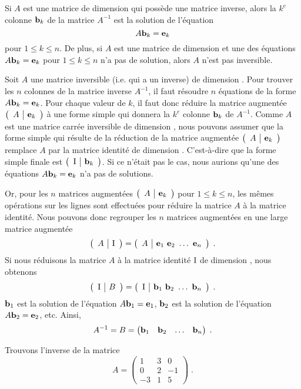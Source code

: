{\begin{prop}
Si $A$ est une matrice de dimension \nn qui possède une matrice
inverse, alors la $k^e$ colonne $\mathbf{b}_k$ de la matrice $A^{-1}$
est la solution de l'équation
\[
A\mathbf{b}_k = \mathbf{e}_k
\]
pour $1\leq k \leq n$.  De plus, si $A$ est une matrice de dimension
\nn et une des équations $A\mathbf{b}_k = \mathbf{e}_k$ pour $1\leq k \leq
n$ n'a pas de solution, alors $A$ n'est pas inversible.
\end{prop}

Soit $A$ une matrice inversible (i.e. qui a un inverse) de dimension
\nn.  Pour trouver les $n$ colonnes de la matrice inverse $A^{-1}$, il
faut résoudre $n$ équations de la forme $A\mathbf{b}_k = \mathbf{e}_k$.
Pour chaque valeur de $k$, il faut donc réduire la matrice augmentée
$\left(\begin{array}{c|c}{A}&{\mathbf{e}_k}\end{array}\right)$ à une forme simple qui donnera la $k^e$ colonne
$\mathbf{b}_k$ de $A^{-1}$.  Comme $A$ est une matrice carrée inversible
de dimension \nn, nous pouvons assumer que la forme simple qui résulte de
la réduction de la matrice augmentée $\left(\begin{array}{c|c}{A}&{\mathbf{e}_k}\end{array}\right)$ remplace
$A$ par la matrice identité de dimension \nn.  C'est-à-dire que la
forme simple finale est $\left(\begin{array}{c|c}{\operatorname{I}}&{\mathbf{b}_k}\end{array}\right)$.  Si ce n'était pas
le cas, nous aurions qu'une des équations $A\mathbf{b}_k = \mathbf{e}_k$ n'a
pas de solutions.

Or, pour les $n$ matrices augmentées $\left(\begin{array}{c|c}{A}&{\mathbf{e}_k}\end{array}\right)$ pour
$1\leq k \leq n$, les mêmes opérations sur les lignes sont effectuées
pour réduire la matrice $A$ à la matrice identité.  Nous pouvons donc
regrouper les $n$ matrices augmentées en une large matrice augmentée
\[
\Maug{A}{\Id} = \Maug{A}{\VEC{e}_1\ \VEC{e}_2\ \ldots\ \VEC{e}_n} \; .
\]
Si nous réduisons la matrice $A$ à la matrice identité $\operatorname{I}$ de dimension
\nn, nous obtenons
\[
\left(\begin{array}{c|c}{\operatorname{I}}&{B}\end{array}\right) = \left(\begin{array}{c|c}{\operatorname{I}}&{\mathbf{b}_1\ \mathbf{b}_2\ \ldots\ \mathbf{b}_n}\end{array}\right) \; .
\]
$\mathbf{b}_1$ est la solution de l'équation $A\mathbf{b}_1 = \mathbf{e}_1$,
$\mathbf{b}_2$ est la solution de l'équation $A\mathbf{b}_2 = \mathbf{e}_2$, etc.
Ainsi,
\[
A^{-1} = B = \begin{pmatrix} \mathbf{b}_1 & \mathbf{b}_2 & \ldots & \mathbf{b}_n
\end{pmatrix} \; .
\]

\begin{egg}
Trouvons l'inverse de la matrice
\[
A = \begin{pmatrix} 1 & 3 & 0 \\ 0 & 2 & -1 \\ -3 & 1 & 5 \end{pmatrix} \; .
\]


\end{egg}}
